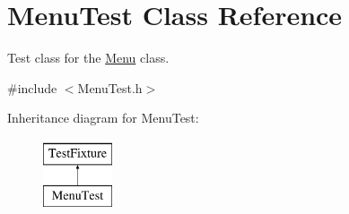 \hypertarget{classMenuTest}{\section{Menu\-Test Class Reference}
\label{classMenuTest}
}


Test class for the \hyperlink{classMenu}{Menu} class.  




{\ttfamily \#include $<$Menu\-Test.\-h$>$}

Inheritance diagram for Menu\-Test\-:\begin{figure}[H]
\begin{center}
\leavevmode
\includegraphics[height=2.000000cm]{classMenuTest}
\end{center}
\end{figure}
